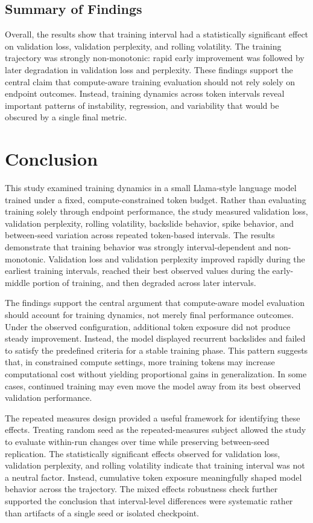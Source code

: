 \documentclass{article}
\begin{document}
\subsection{Summary of Findings}

Overall, the results show that training interval had a statistically significant effect on validation loss, validation perplexity, and rolling volatility. The training trajectory was strongly non-monotonic: rapid early improvement was followed by later degradation in validation loss and perplexity. These findings support the central claim that compute-aware training evaluation should not rely solely on endpoint outcomes. Instead, training dynamics across token intervals reveal important patterns of instability, regression, and variability that would be obscured by a single final metric.

\section{Conclusion}

This study examined training dynamics in a small Llama-style language model trained under a fixed, compute-constrained token budget. Rather than evaluating training solely through endpoint performance, the study measured validation loss, validation perplexity, rolling volatility, backslide behavior, spike behavior, and between-seed variation across repeated token-based intervals. The results demonstrate that training behavior was strongly interval-dependent and non-monotonic. Validation loss and validation perplexity improved rapidly during the earliest training intervals, reached their best observed values during the early-middle portion of training, and then degraded across later intervals.

The findings support the central argument that compute-aware model evaluation should account for training dynamics, not merely final performance outcomes. Under the observed configuration, additional token exposure did not produce steady improvement. Instead, the model displayed recurrent backslides and failed to satisfy the predefined criteria for a stable training phase. This pattern suggests that, in constrained compute settings, more training tokens may increase computational cost without yielding proportional gains in generalization. In some cases, continued training may even move the model away from its best observed validation performance.

The repeated measures design provided a useful framework for identifying these effects. Treating random seed as the repeated-measures subject allowed the study to evaluate within-run changes over time while preserving between-seed replication. The statistically significant effects observed for validation loss, validation perplexity, and rolling volatility indicate that training interval was not a neutral factor. Instead, cumulative token exposure meaningfully shaped model behavior across the trajectory. The mixed effects robustness check further supported the conclusion that interval-level differences were systematic rather than artifacts of a single seed or isolated checkpoint.
\end{document}
